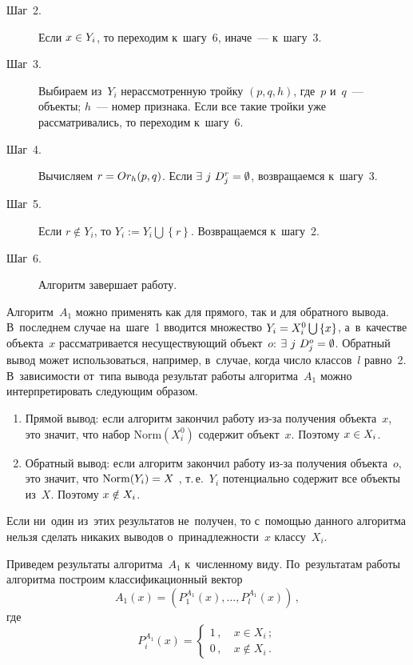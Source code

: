\begin{multicols}{2}
\begin{description}
\item[Шаг~2.] Если $ x \hm\in Y_{i} $, то переходим к~шагу~6, иначе~--- к~шагу~3.

\item[Шаг~3.] Выбираем из~$Y_{i}$ нерассмотренную тройку $(p,q,h) $, где~$p$ и~$q$~--- 
объекты; $h$~--- номер признака.
Если все такие тройки уже рассматривались, то переходим к~шагу~6.

\item[Шаг~4.] Вычисляем $r\hm=Or_{h}(p,q) $. Если $\exists\ j \ D_{j}^{r}\hm=\emptyset$, 
возвращаемся к~шагу~3.

\item[Шаг~5.] Если $r \notin Y_{i} $, то $ Y_{i} := Y_{i} \bigcup \left\lbrace r 
\right\rbrace$. Возвращаемся к~шагу~2.

\item[Шаг~6.] Алгоритм завершает работу.
\end{description}

Алгоритм~$ A_{1} $ можно применять как для прямого, так и для обратного вывода.
В~последнем случае на~шаге~1 вводится множество $ Y_{i}\hm=X_{i}^{0} \bigcup 
\left\lbrace x \right\rbrace$, а~в~качестве объекта~$x$ рассматривается несуществующий 
объект~$o$: $\exists\ j \ D_{j}^{o}\hm=\emptyset$.
Обратный вывод может использоваться, например, в~случае, когда число классов~$l$ 
рав\-но~2.
В~зависимости от~типа вывода результат работы алгоритма~$A_{1}$ можно 
интерпретировать следующим образом.
\begin{enumerate}[1.]
\item Прямой вывод: если алгоритм закончил работу из-за получения объекта~$x$, 
это значит, что набор $\mathrm{Norm}(X_{i}^{0})$ содержит объект~$x$.
Поэтому  $x \hm\in X_{i}$.

\item Обратный вывод: если алгоритм закончил работу из-за 
получения объекта~$o$, это значит, что $ \mathrm{Norm}(Y_{i})\hm=X $ , т.\,е.~$Y_{i}$ 
потенциально содержит все объекты из~$X$.
Поэтому $x \hm\notin X_{i}$.
\end{enumerate}

Если ни~один из~этих результатов не~получен, то с~по\-мощью данного 
алгоритма нельзя сделать никаких выводов о~принадлежности~$x$ классу~$X_{i}$.

Приведем результаты алгоритма~$A_{1}$ к~численному виду.
По~результатам работы алгоритма построим классификационный вектор
$$
A_{1}(x)=\left(P_{1}^{A_{1}}(x),\ldots,P_{l}^{A_{1}}(x)\right) \,,
$$
где 
$$
P_{i}^{A_{1}}(x) = \begin{cases}
1\,, &\ x \in X_{i}\,; \\
0\,, &\ x \notin X_{i}\,.
\end{cases} 
$$


\end{multicols}
